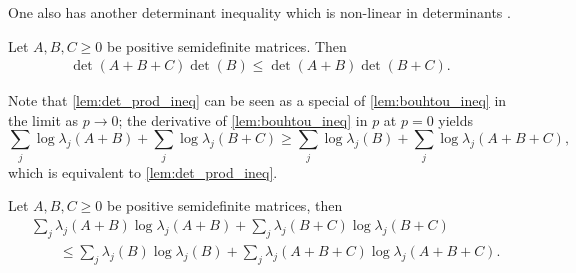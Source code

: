 \documentclass[notitlepage, 10pt]{article}
\begin{document}
One also has another determinant inequality which is non-linear in determinants \cite[Lemma 2.3]{tie2011rearrangement}.
\begin{lem}
    \label{lem:det_prod_ineq}
    Let $A,B,C \geq 0$ be positive semidefinite matrices.
    Then
    \begin{align}
        \det(A+B+C)\det(B) \leq \det(A+B)\det(B+C).
    \end{align}
\end{lem}
Note that \cref{lem:det_prod_ineq} can be seen as a special of \cref{lem:bouhtou_ineq} in the limit as $p\to 0$; the derivative of \cref{lem:bouhtou_ineq} in $p$ at $p=0$ yields
\begin{equation}
    \label{eq:bouhtou_ineq_p_zero}
    \sum_{j}\log \lambda_j(A+B) + \sum_{j}\log\lambda_j(B+C) \geq \sum_{j}\log\lambda_j(B) + \sum_{j}\log \lambda_j(A+B+C),
\end{equation}
which is equivalent to \cref{lem:det_prod_ineq}.

\begin{thm}
    \label{thm:ssa_ineq}
    Let $A,B,C \geq 0$ be positive semidefinite matrices, then
    \begin{align}
        \label{eq:SSA_like_ineq}
        &\sum_{j}\lambda_j(A+B)\log \lambda_j(A+B)+ \sum_{j}\lambda_j(B+C)\log \lambda_j(B+C) \\
        &\qquad\leq \sum_{j}\lambda_j(B)\log\lambda_j(B) + \sum_{j}\lambda_j(A+B+C)\log\lambda_j(A+B+C).
    \end{align}
\end{thm}
\end{document}
